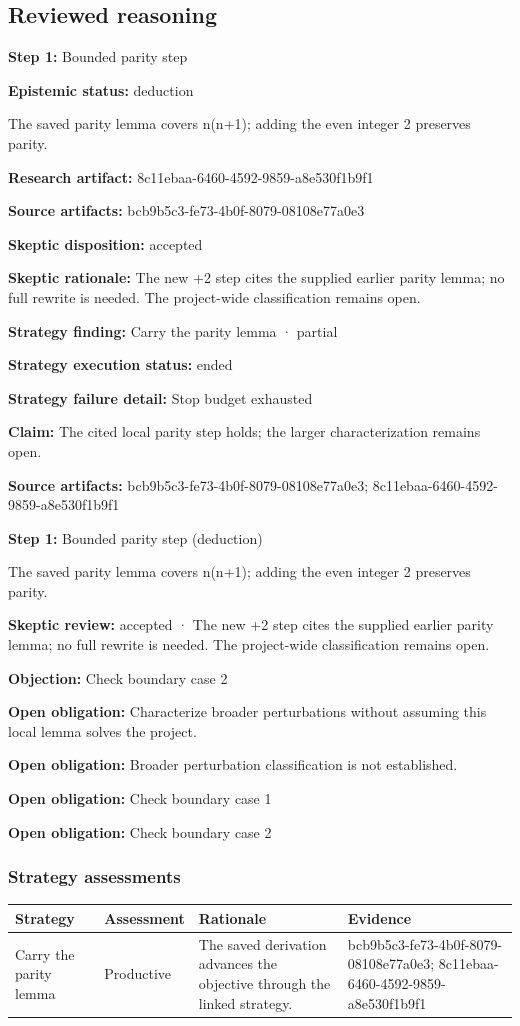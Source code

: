 \documentclass[11pt]{article}
\begin{document}
\subsection{Reviewed reasoning}
\textbf{Step 1:} Bounded parity step\par
\textbf{Epistemic status:} deduction\par
The saved parity lemma covers n(n+1); adding the even integer 2 preserves parity.\par
\textbf{Research artifact:} 8c11ebaa-6460-4592-9859-a8e530f1b9f1\par
\textbf{Source artifacts:} bcb9b5c3-fe73-4b0f-8079-08108e77a0e3\par
\textbf{Skeptic disposition:} accepted\par
\textbf{Skeptic rationale:} The new +2 step cites the supplied earlier parity lemma; no full rewrite is needed. The project-wide classification remains open.\par
\textbf{Strategy finding:} Carry the parity lemma · partial\par
\textbf{Strategy execution status:} ended\par
\textbf{Strategy failure detail:} Stop budget exhausted\par
\textbf{Claim:} The cited local parity step holds; the larger characterization remains open.\par
\textbf{Source artifacts:} bcb9b5c3-fe73-4b0f-8079-08108e77a0e3; 8c11ebaa-6460-4592-9859-a8e530f1b9f1\par
\textbf{Step 1:} Bounded parity step (deduction)\par
The saved parity lemma covers n(n+1); adding the even integer 2 preserves parity.\par
\textbf{Skeptic review:} accepted · The new +2 step cites the supplied earlier parity lemma; no full rewrite is needed. The project-wide classification remains open.\par
\textbf{Objection:} Check boundary case 2\par
\textbf{Open obligation:} Characterize broader perturbations without assuming this local lemma solves the project.\par
\textbf{Open obligation:} Broader perturbation classification is not established.\par
\textbf{Open obligation:} Check boundary case 1\par
\textbf{Open obligation:} Check boundary case 2\par
\subsubsection*{Strategy assessments}
\begin{longtable}{>{\raggedright\arraybackslash}p{.16\linewidth}>{\raggedright\arraybackslash}p{.15\linewidth}>{\raggedright\arraybackslash}p{.40\linewidth}>{\raggedright\arraybackslash}p{.17\linewidth}}
\toprule Strategy & Assessment & Rationale & Evidence \\
\midrule\endhead
Carry the parity lemma & Productive & The saved derivation advances the objective through the linked strategy. & bcb9b5c3-fe73-4b0f-8079-08108e77a0e3; 8c11ebaa-6460-4592-9859-a8e530f1b9f1 \\
\bottomrule
\end{longtable}
\end{document}
